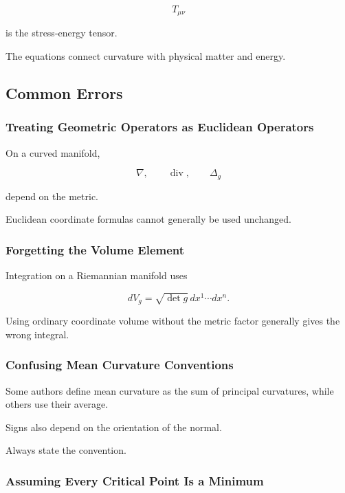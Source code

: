 \[
T_{\mu\nu}
\]

is the stress-energy tensor.

The equations connect curvature with physical matter and energy.

\subsection{Common Errors}
\label{subsec:geometric-analysis-common-errors}

\subsubsection{Treating Geometric Operators as Euclidean Operators}

On a curved manifold,

\[
\nabla,
\qquad
\operatorname{div},
\qquad
\Delta_g
\]

depend on the metric.

Euclidean coordinate formulas cannot generally be used unchanged.

\subsubsection{Forgetting the Volume Element}

Integration on a Riemannian manifold uses

\[
\boxed{
dV_g
=
\sqrt{\det g}\,dx^1\cdots dx^n.
}
\]

Using ordinary coordinate volume without the metric factor generally
gives the wrong integral.

\subsubsection{Confusing Mean Curvature Conventions}

Some authors define mean curvature as the sum of principal curvatures,
while others use their average.

Signs also depend on the orientation of the normal.

Always state the convention.

\subsubsection{Assuming Every Critical Point Is a Minimum}

